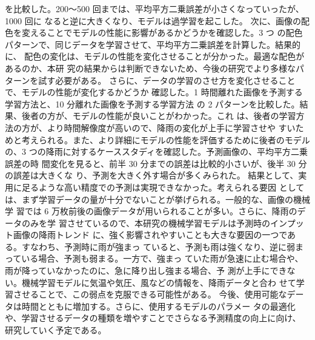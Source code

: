 を比較した。200～500 回までは、平均平方二乗誤差が小さくなっていったが、1000 回に
なると逆に大きくなり、モデルは過学習を起こした。
次に、画像の配色を変えることでモデルの性能に影響があるかどうかを確認した。3 つ
の配色パターンで、同じデータを学習させて、平均平方二乗誤差を計算した。結果的に、
配色の変化は、モデルの性能を変化させることが分かった。最適な配色があるのか、本研
究の結果からは判断できないため、今後の研究でより多様なパターンを試す必要がある。
さらに、データの学習のさせ方を変化させることで、モデルの性能が変化するかどうか
確認した。1 時間離れた画像を予測する学習方法と、10 分離れた画像を予測する学習方法
の 2 パターンを比較した。結果、後者の方が、モデルの性能が良いことがわかった。これ
は、後者の学習方法の方が、より時間解像度が高いので、降雨の変化が上手に学習させや
すいためと考えられる。また、より詳細にモデルの性能を評価するために後者のモデル
の、3 つの降雨に対するケーススタディを確認した。予測画像の、平均平方二乗誤差の時
間変化を見ると、前半 30 分までの誤差は比較的小さいが、後半 30 分の誤差は大きくな
り、予測を大きく外す場合が多くみられた。
結果として、実用に足るような高い精度での予測は実現できなかった。考えられる要因
としては、まず学習データの量が十分でないことが挙げられる。一般的な、画像の機械学
習では 6 万枚前後の画像データが用いられることが多い。さらに、降雨のデータのみを学
習させているので、本研究の機械学習モデルは予測時のインプット画像の降雨トレンド
に、強く影響されやすいことも大きな要因の一つである。すなわち、予測時に雨が強まっ
ていると、予測も雨は強くなり、逆に弱まっている場合、予測も弱まる。一方で、強まっ
ていた雨が急速に止む場合や、雨が降っていなかったのに、急に降り出し強まる場合、予
測が上手にできない。機械学習モデルに気温や気圧、風などの情報を、降雨データと合わ
せて学習させることで、この弱点を克服できる可能性がある。
今後、使用可能なデータは時間とともに増加する。さらに、使用するモデルのパラメー
タの最適化や、学習させるデータの種類を増やすことでさらなる予測精度の向上に向け、
研究していく予定である。